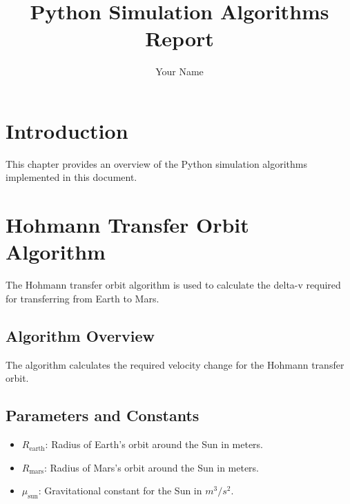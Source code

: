 \documentclass{report}
\title{Python Simulation Algorithms Report}
\author{Your Name}
\begin{document}
\maketitle

\tableofcontents

\chapter{Introduction}
This chapter provides an overview of the Python simulation algorithms implemented in this document.

\chapter{Hohmann Transfer Orbit Algorithm}
The Hohmann transfer orbit algorithm is used to calculate the delta-v required for transferring from Earth to Mars.

\section{Algorithm Overview}
The algorithm calculates the required velocity change for the Hohmann transfer orbit.

\section{Parameters and Constants}
\begin{itemize}
  \item $R_{\text{earth}}$: Radius of Earth's orbit around the Sun in meters.
  \item $R_{\text{mars}}$: Radius of Mars's orbit around the Sun in meters.
  \item $\mu_{\text{sun}}$: Gravitational constant for the Sun in $m^3/s^2$.
\end{itemize}
\end{document}
